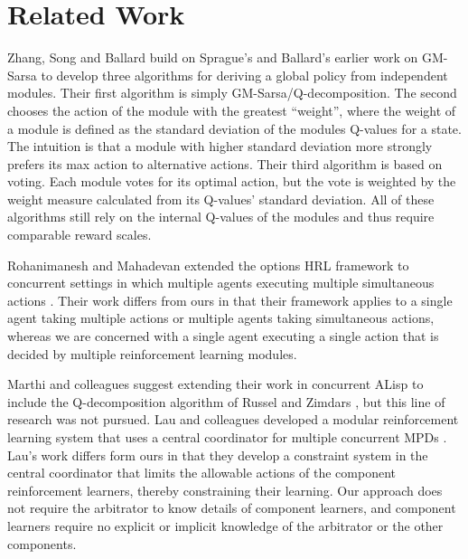 

\section{Related Work}

Zhang, Song and Ballard \cite{zhang2015global} build on Sprague's and Ballard's earlier work on GM-Sarsa to develop three algorithms for deriving a global policy from independent modules. Their first algorithm is simply GM-Sarsa/Q-decomposition. The second chooses the action of the module with the greatest ``weight'', where the weight of a module is defined as the standard deviation of the modules Q-values for a state. The intuition is that a module with higher standard deviation more strongly prefers its max action to alternative actions.  Their third algorithm is based on voting. Each module votes for its optimal action, but the vote is weighted by the weight measure calculated from its Q-values' standard deviation. All of these algorithms still rely on the internal Q-values of the modules and thus require comparable reward scales.

Rohanimanesh and Mahadevan extended the options HRL framework to concurrent settings in which multiple agents executing multiple simultaneous actions \cite{rohanimanesh2001decision,rohanimanesh2002learning}. Their work differs from ours in that their framework applies to a single agent taking multiple actions or multiple agents taking simultaneous actions, whereas we are concerned with a single agent executing a single action that is decided by multiple reinforcement learning modules.

Marthi and colleagues \cite{marthi2005concurrent} suggest extending their work in concurrent ALisp to include the Q-decomposition algorithm of Russel and Zimdars \cite{russell2003q-decomposition}, but this line of research was not pursued. Lau and colleagues developed a modular reinforcement learning system that uses a central coordinator for multiple concurrent MPDs \cite{lau2012coordination}. Lau's work differs form ours in that they develop a constraint system in the central coordinator that limits the allowable actions of the component reinforcement learners, thereby constraining their learning. Our approach does not require the arbitrator to know details of component learners, and component learners require no explicit or implicit knowledge of the arbitrator or the other components.

